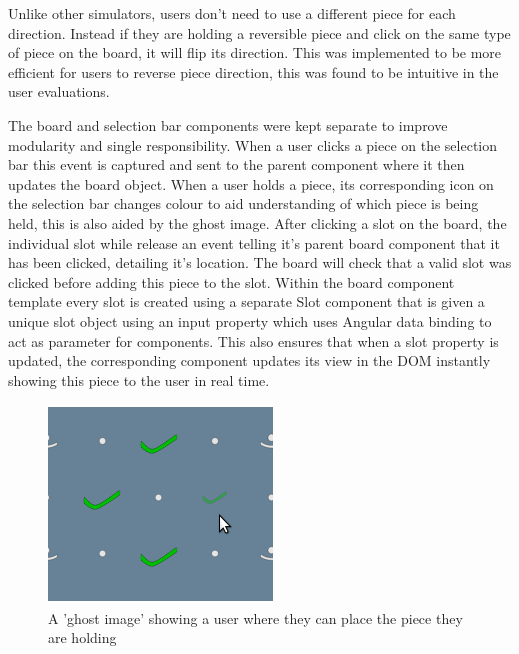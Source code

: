 \documentclass{l4proj}
\begin{document}
Unlike other simulators, users don't need to use a different piece for each direction. Instead if they are holding a reversible piece and click on the same type of piece on the board, it will flip its direction. This was implemented to be more efficient for users to reverse piece direction, this was found to be intuitive in the user evaluations. 

The board and selection bar components were kept separate to improve modularity and single responsibility. When a user clicks a piece on the selection bar this event is captured and sent to the parent component where it then updates the board object. When a user holds a piece, its corresponding icon on the selection bar changes colour to aid understanding of which piece is being held, this is also aided by the ghost image. After clicking a slot on the board, the individual slot while release an event telling it's parent board component that it has been clicked, detailing it's location. The board will check that a valid slot was clicked before adding this piece to the slot. Within the board component template every slot is created using a separate Slot component that is given a unique slot object using an input property which uses Angular data binding to act as parameter for components. This also ensures that when a slot property is updated, the corresponding component updates its view in the DOM instantly showing this piece to the user in real time.



\begin{figure}
    \centering
    \includegraphics[width=0.4\linewidth]{images/ghostImage.png}
    \caption{A 'ghost image' showing a user where they can place the piece they are holding}
    \label{fig:ghostPiece}
\end{figure}
\end{document}
